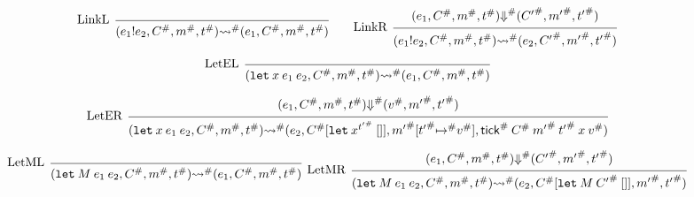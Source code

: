 \documentclass{article}
\theoremstyle{definition}
\newcommand*{\A}[1]{{#1}^{\#}}
\newcommand*{\mem}{m}
\newcommand*{\link}[2]{{#1}\mathtt{!}{#2}}
\newcommand*{\tick}{\mathsf{tick}}
\begin{document}
\[
  \begin{prooftree}
    \infer[left label=LinkL]0{
    (\link{e_{1}}{e_{2}}, \A{C}, \A{\mem}, \A{t})
    \A\rightsquigarrow
    (e_{1}, \A{C}, \A{\mem}, \A{t})
    }
  \end{prooftree}\qquad
  \begin{prooftree}
    \hypo{
      \begin{matrix}
        (e_{1}, \A{C}, \A{\mem}, \A{t})
        \A{\Downarrow}
        (\A{C'}, \A{\mem'}, \A{t'})
      \end{matrix}
    }
    \infer[left label=LinkR]1{
    (\link{e_{1}}{e_{2}}, \A{C}, \A{\mem}, \A{t})
    \A\rightsquigarrow
    (e_{2}, \A{C'}, \A{\mem'}, \A{t'})
    }
  \end{prooftree}
\]

\[
  \begin{prooftree}
    \infer[left label=LetEL]0{
    (\mathtt{let}\:x\:e_1\:e_2, \A{C}, \A{\mem}, \A{t})
    \A\rightsquigarrow
    (e_{1}, \A{C}, \A{\mem}, \A{t})
    }
  \end{prooftree}
\]

\[
  \begin{prooftree}
    \hypo{
      \begin{matrix}
        (e_{1}, \A{C}, \A{\mem}, \A{t})
        \A\Downarrow
        (\A{v}, \A{\mem'}, \A{t'})
      \end{matrix}
    }
    \infer[left label=LetER]1{
    (\mathtt{let}\:x\:e_1\:e_2, \A{C}, \A{\mem}, \A{t})
    \A\rightsquigarrow
    (e_{2}, \A{C}[\mathtt{let}\:x^{\A{t'}}\:[]], \A{\mem'}[\A{t'}\A{\mapsto} \A{v}], \A{\tick}\:\A{C}\:\A{\mem'}\:\A{t'}\:x\:\A{v})
    }
  \end{prooftree}
\]

\[
  \begin{prooftree}
    \infer[left label=LetML]0{
    (\mathtt{let}\:M\:e_{1}\:e_{2}, \A{C}, \A{\mem}, \A{t})
    \A\rightsquigarrow
    (e_{1}, \A{C}, \A{\mem}, \A{t})
    }
  \end{prooftree}\:\:
  \begin{prooftree}
    \hypo{
      \begin{matrix}
        (e_{1}, \A{C}, \A{\mem}, \A{t})
        \A\Downarrow
        (\A{C'}, \A{\mem'}, \A{t'})
      \end{matrix}
    }
    \infer[left label=LetMR]1{
    (\mathtt{let}\:M\:e_{1}\:e_{2}, \A{C}, \A{\mem}, \A{t})
    \A\rightsquigarrow
    (e_{2}, \A{C}[\mathtt{let}\:M\:\A{C'}\:[]], \A{\mem'}, \A{t'})
    }
  \end{prooftree}
\]
\end{document}
